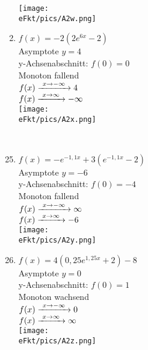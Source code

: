 \begin{Answer}[ref=eFktA2]
\begin{minipage}{\textwidth}
\begin{minipage}[t]{0.49\textwidth}
\begin{enumerate}[label=\alph*)]
				\texttt{[image: \\eFkt/pics/A2w.png]}
				\item \(f(x)=-2\left( 2e^{6x}-2\right) \)\\
				Asymptote \(y=4\)\\
				y-Achsenabschnitt: \(f(0)=0\)\\
				Monoton fallend\\
				\(f(x)\xrightarrow{\hphantom{\ }x\to-\infty\hphantom{\ }}4\)\\
				\(f(x)\xrightarrow{\hphantom{\ }x\to\infty\hphantom{\ }}-\infty\)\\
				\texttt{[image: \\eFkt/pics/A2x.png]}
			\end{enumerate}
		\end{minipage}
	\end{minipage}\\
	\newpage
	\begin{minipage}{\textwidth}
		\begin{minipage}[t]{0.49\textwidth}
			\begin{enumerate}[label=\alph*)]
				\setcounter{enumi}{24}
				\item \(f(x)=-e^{-1,1x}+3\left(e^{-1,1x}-2\right)\)\\
				Asymptote \(y=-6\)\\
				y-Achsenabschnitt: \(f(0)=-4\)\\
				Monoton fallend\\
				\(f(x)\xrightarrow{\hphantom{\ }x\to-\infty\hphantom{\ }}\infty\)\\
				\(f(x)\xrightarrow{\hphantom{\ }x\to\infty\hphantom{\ }}-6\)\\
				\texttt{[image: \\eFkt/pics/A2y.png]}
			\end{enumerate}
		\end{minipage}
		\begin{minipage}[t]{0.49\textwidth}
			\begin{enumerate}[label=\alph*)]
				\setcounter{enumi}{25}
				\item \(f(x)=4\left( 0,25e^{1,25x}+2\right) -8\)\\
				Asymptote \(y=0\)\\
				y-Achsenabschnitt: \(f(0)=1\)\\
				Monoton wachsend\\
				\(f(x)\xrightarrow{\hphantom{\ }x\to-\infty\hphantom{\ }}0\)\\
				\(f(x)\xrightarrow{\hphantom{\ }x\to\infty\hphantom{\ }}\infty\)\\
				\texttt{[image: \\eFkt/pics/A2z.png]}
			\end{enumerate}
		\end{minipage}
	\end{minipage}
\end{Answer}